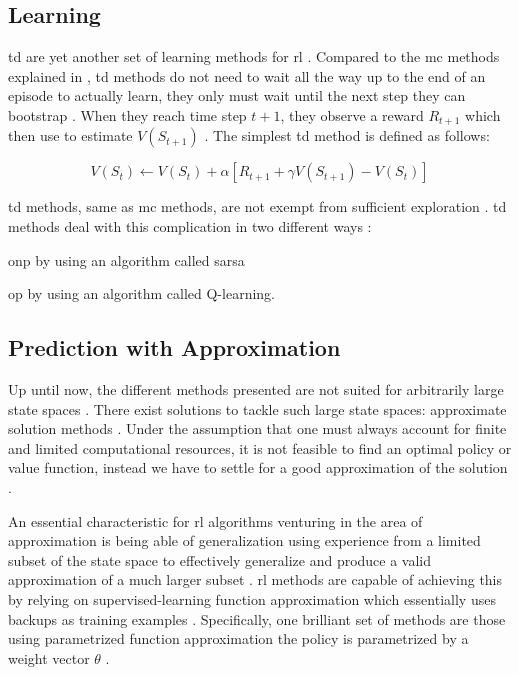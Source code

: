 \subsection{ Learning}
\label{subsec:td_learning}

\gls{td} are yet another set of learning methods for \gls{rl} \citep{Sutton2017}. Compared to the \gls{mc} methods explained in , \gls{td} methods do not need to wait all the way up to the end of an episode to actually learn, they only must wait until the next step \ie they can bootstrap \citep[p. 128]{Sutton2017}. When they reach time step $t+1$, they observe a reward $R_{t+1}$ which then use to estimate $V(S_{t+1})$ \citep[p. 128]{Sutton2017}. The simplest \gls{td} method is defined as follows:

\begin{equation}
\label{eq:td_update}
	V(S_t) \leftarrow V(S_t) + \alpha [R_{t+1} + \gamma V(S_{t+1}) - V(S_t)]
\end{equation}

\gls{td} methods, same as \gls{mc} methods, are not exempt from sufficient exploration \citep[p. 147]{Sutton2017}. \gls{td} methods deal with this complication in two different ways \citep[p. 128]{Sutton2017}:
\begin{enumerate*}
	\item \gls{onp} by using an algorithm called \gls{sarsa}
	\item \gls{op} by using an algorithm called Q-learning.
\end{enumerate*}

\subsection{ Prediction with Approximation}
\label{subsec:onpol_pred}

Up until now, the different methods presented are not suited for arbitrarily large state spaces \citep{Sutton2017}. There exist solutions to tackle such large state spaces: approximate solution methods \citep{Sutton2017}. Under the assumption that one must always account for finite and limited computational resources, it is not feasible to find an optimal policy or value function, instead we have to settle for a good approximation of the solution \citep[p. 189]{Sutton2017}.

An essential characteristic for \gls{rl} algorithms venturing in the area of approximation is being able of generalization \ie using experience from a limited subset of the state space to effectively generalize and produce a valid approximation of a much larger subset  \citep[p. 189]{Sutton2017}. \gls{rl} methods are capable of achieving this by relying on supervised-learning function approximation which essentially uses backups as training examples \citep[p. 222]{Sutton2017}. Specifically, one brilliant set of methods are those using parametrized function approximation \ie the policy is parametrized by a weight vector $\theta$ \citep{Sutton2017}.

